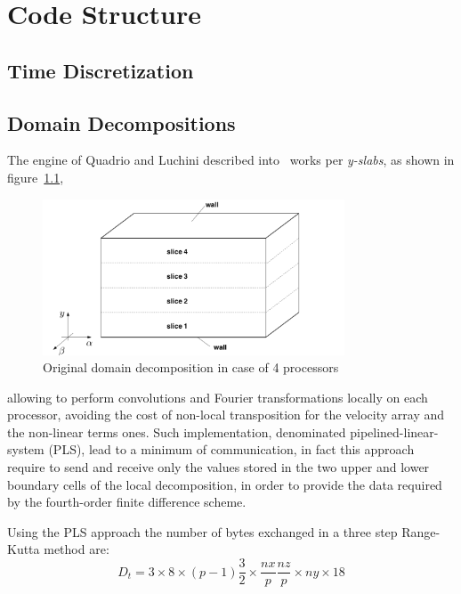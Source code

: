 \chapter{Code Structure}





\section{Time Discretization}





\section{Domain Decompositions}
The engine of Quadrio and Luchini described into~\cite{cpl:presentazione} works per \emph{y-slabs}, as shown in figure~\ref{domain_decomp},
\begin{figure}
\centering
\includegraphics[width=0.8\textwidth]{grafici/decomp_dominio_cpl}
\caption{Original domain decomposition in case of 4 processors}
\label{domain_decomp}
\end{figure}
 allowing to perform convolutions and Fourier transformations locally on each processor, avoiding the cost of non-local transposition for the velocity array and the non-linear terms ones. Such implementation, denominated pipelined-linear-system (PLS), lead to a minimum of communication, in fact this approach require to send and receive only the values stored in the two upper and lower boundary cells of the local decomposition, in order to provide the data required by the fourth-order finite difference scheme.
 \par
 Using the PLS approach the number of bytes exchanged in a three step Range-Kutta method are:
 \begin{equation}
 D_{t} = 3 \times 8 \times (p-1) \frac{3}{2} \times \frac{nx}{p} \frac{nz}{p} \times ny \times 18
 \label{exchange:data:cpl}
 \end{equation}
